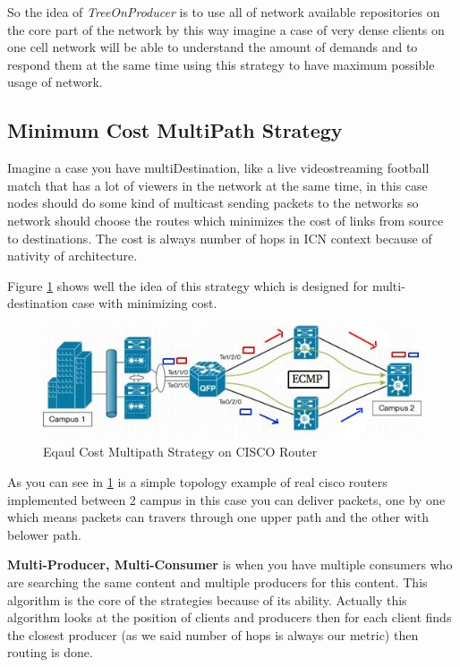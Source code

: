 So the idea of \textit{TreeOnProducer} is to use all of network available repositories on the core part of the network by this way imagine a case of very dense clients on one cell network will be able to understand the amount of demands and to respond them at the same time using this strategy to have maximum possible usage of network. 

\subsection{Minimum Cost MultiPath Strategy}
Imagine a case you have multiDestination, like a live videostreaming football match that has a lot of viewers in the network at the same time, in this case nodes should do some kind of multicast sending packets to the networks so network should choose the routes which minimizes the cost of links from source to destinations. The cost is always number of hops in ICN context because of nativity of architecture. 

Figure \ref{balance} shows well the idea of this strategy which is designed for multi-destination case with minimizing cost.

\begin{figure}[H]

\begin{center}

\includegraphics[scale = 0.7]{Pictures/balance.jpg}

\caption{Eqaul Cost Multipath Strategy on CISCO Router} \label{balance} 

\end{center}

\end{figure}

As you can see in \ref{balance} is a simple topology example of real cisco routers implemented between 2 campus in this case you can deliver packets, one by one which means packets can travers through one upper path and the other with belower path.

\textbf{Multi-Producer, Multi-Consumer} is when you have multiple consumers who are searching the same content and multiple producers for this content. This algorithm is the core of the strategies because of its ability. Actually this algorithm looks at the position of clients and producers then for each client finds the closest producer (as we said number of hops is always our metric) then routing is done.



